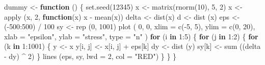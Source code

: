 \documentclass[
  12pt,
  letterpaper,
  DIV=11,
  numbers=noendperiod]{scrreprt}
\newenvironment{Shaded}{\begin{snugshade}}{\end{snugshade}}
\newcommand{\AttributeTok}[1]{\textcolor[rgb]{0.40,0.45,0.13}{#1}}
\newcommand{\ControlFlowTok}[1]{\textcolor[rgb]{0.00,0.23,0.31}{\textbf{#1}}}
\newcommand{\DecValTok}[1]{\textcolor[rgb]{0.68,0.00,0.00}{#1}}
\newcommand{\FunctionTok}[1]{\textcolor[rgb]{0.28,0.35,0.67}{#1}}
\newcommand{\NormalTok}[1]{\textcolor[rgb]{0.00,0.23,0.31}{#1}}
\newcommand{\OtherTok}[1]{\textcolor[rgb]{0.00,0.23,0.31}{#1}}
\newcommand{\SpecialCharTok}[1]{\textcolor[rgb]{0.37,0.37,0.37}{#1}}
\newcommand{\StringTok}[1]{\textcolor[rgb]{0.13,0.47,0.30}{#1}}
\theoremstyle{remark}
\begin{document}
\begin{Shaded}
\begin{Highlighting}[]
\NormalTok{dummy }\OtherTok{\textless{}{-}} \ControlFlowTok{function}\NormalTok{ () \{}
  \FunctionTok{set.seed}\NormalTok{(}\DecValTok{12345}\NormalTok{)}
\NormalTok{  x }\OtherTok{\textless{}{-}} \FunctionTok{matrix}\NormalTok{(}\FunctionTok{rnorm}\NormalTok{(}\DecValTok{10}\NormalTok{), }\DecValTok{5}\NormalTok{, }\DecValTok{2}\NormalTok{)}
\NormalTok{  x }\OtherTok{\textless{}{-}} \FunctionTok{apply}\NormalTok{ (x, }\DecValTok{2}\NormalTok{, }\ControlFlowTok{function}\NormalTok{(x)}
\NormalTok{    x }\SpecialCharTok{{-}} \FunctionTok{mean}\NormalTok{(x))}
\NormalTok{  delta }\OtherTok{\textless{}{-}} \FunctionTok{dist}\NormalTok{(x)}
\NormalTok{  d }\OtherTok{\textless{}{-}} \FunctionTok{dist}\NormalTok{ (x)}
\NormalTok{  eps }\OtherTok{\textless{}{-}}\NormalTok{ (}\SpecialCharTok{{-}}\DecValTok{500}\SpecialCharTok{:}\DecValTok{500}\NormalTok{) }\SpecialCharTok{/} \DecValTok{100}
\NormalTok{  sy }\OtherTok{\textless{}{-}} \FunctionTok{rep}\NormalTok{ (}\DecValTok{0}\NormalTok{, }\DecValTok{1001}\NormalTok{)}
  \FunctionTok{plot}\NormalTok{ (}
    \DecValTok{0}\NormalTok{,}
    \DecValTok{0}\NormalTok{,}
    \AttributeTok{xlim =} \FunctionTok{c}\NormalTok{(}\SpecialCharTok{{-}}\DecValTok{5}\NormalTok{, }\DecValTok{5}\NormalTok{),}
    \AttributeTok{ylim =} \FunctionTok{c}\NormalTok{(}\DecValTok{0}\NormalTok{, }\DecValTok{20}\NormalTok{),}
    \AttributeTok{xlab =} \StringTok{"epsilon"}\NormalTok{,}
    \AttributeTok{ylab =} \StringTok{"stress"}\NormalTok{,}
    \AttributeTok{type =} \StringTok{"n"}
\NormalTok{  )}
  \ControlFlowTok{for}\NormalTok{ (i }\ControlFlowTok{in} \DecValTok{1}\SpecialCharTok{:}\DecValTok{5}\NormalTok{) \{}
    \ControlFlowTok{for}\NormalTok{ (j }\ControlFlowTok{in} \DecValTok{1}\SpecialCharTok{:}\DecValTok{2}\NormalTok{) \{}
      \ControlFlowTok{for}\NormalTok{ (k }\ControlFlowTok{in} \DecValTok{1}\SpecialCharTok{:}\DecValTok{1001}\NormalTok{) \{}
\NormalTok{        y }\OtherTok{\textless{}{-}}\NormalTok{ x}
\NormalTok{        y[i, j] }\OtherTok{\textless{}{-}}\NormalTok{ x[i, j] }\SpecialCharTok{+}\NormalTok{ eps[k]}
\NormalTok{        dy }\OtherTok{\textless{}{-}} \FunctionTok{dist}\NormalTok{ (y)}
\NormalTok{        sy[k] }\OtherTok{\textless{}{-}} \FunctionTok{sum}\NormalTok{ ((delta }\SpecialCharTok{{-}}\NormalTok{ dy) }\SpecialCharTok{\^{}} \DecValTok{2}\NormalTok{)}
\NormalTok{      \}}
      \FunctionTok{lines}\NormalTok{ (eps, sy, }\AttributeTok{lwd =} \DecValTok{2}\NormalTok{, }\AttributeTok{col =} \StringTok{"RED"}\NormalTok{)}
\NormalTok{    \}}
\NormalTok{  \}}
\NormalTok{\}}



\end{Highlighting}
\end{Shaded}
\end{document}
